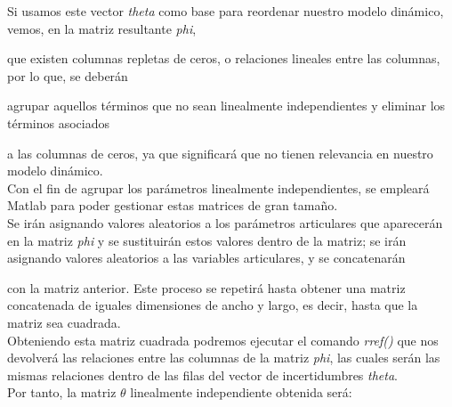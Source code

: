 Si usamos este vector \textit{theta} como base para reordenar nuestro modelo dinámico, vemos, en la matriz resultante \textit{phi},

que existen columnas repletas de ceros, o relaciones lineales entre las columnas, por lo que, se deberán

agrupar aquellos términos que no sean linealmente independientes y eliminar los términos asociados

a las columnas de ceros, ya que significará que no tienen relevancia en nuestro modelo dinámico.\\



Con el fin de agrupar los parámetros linealmente independientes, se empleará Matlab para poder gestionar estas matrices de gran tamaño.\\

Se irán asignando valores aleatorios a los parámetros articulares que aparecerán en la matriz \textit{phi} y se sustituirán estos valores dentro de la matriz; se irán asignando valores aleatorios a las variables articulares, y se concatenarán

con la matriz anterior. Este proceso se repetirá hasta obtener una matriz concatenada de iguales dimensiones de ancho y largo, es decir, hasta que la matriz sea cuadrada.\\



Obteniendo esta matriz cuadrada podremos ejecutar el comando \textit{rref()} que nos devolverá las relaciones entre las columnas de la matriz \textit{phi}, las cuales serán las mismas relaciones dentro de las filas del vector de incertidumbres \textit{theta}.\\



Por tanto, la matriz $\theta$ linealmente independiente obtenida será:

